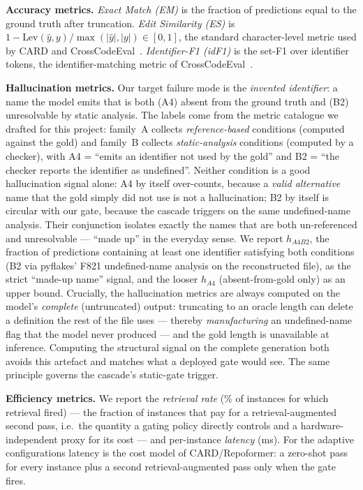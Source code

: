 \documentclass[10pt,conference]{IEEEtran}
\newcommand{\ugr}[1]{{\color{revgreen}#1}}
\begin{document}
\textbf{Accuracy metrics.} \emph{Exact Match (EM)} is the fraction of predictions
equal to the ground truth after truncation. \emph{Edit Similarity (ES)} is
$1-\text{Lev}(\hat{y},y)/\max(|\hat{y}|,|y|)\in[0,1]$, the standard
character-level metric used by CARD and CrossCodeEval~\cite{zhang2024card,ding2023cce}.
\emph{Identifier-F1 (idF1)} is the set-F1 over identifier tokens, the
identifier-matching metric of CrossCodeEval~\cite{ding2023cce}.

\textbf{Hallucination metrics.} Our target failure mode is the \emph{invented
identifier}: a name the model emits that is both (A4) absent from the ground truth
and (B2) unresolvable by static analysis. \ugr{The labels come from the metric
catalogue we drafted for this project: family~A collects \emph{reference-based}
conditions (computed against the gold) and family~B collects
\emph{static-analysis} conditions (computed by a checker), with A4 =
``emits an identifier not used by the gold'' and B2 = ``the checker reports the
identifier as undefined''. Neither condition is a good hallucination signal
alone: A4 by itself over-counts, because a \emph{valid alternative} name that
the gold simply did not use is not a hallucination; B2 by itself is circular
with our gate, because the cascade triggers on the same undefined-name analysis.
Their conjunction isolates exactly the names that are both un-referenced and
unresolvable --- ``made up'' in the everyday sense.} We report \textbf{$h_{A4B2}$}, the
fraction of predictions containing at least one identifier satisfying both
conditions (B2 via pyflakes' F821 undefined-name analysis on the reconstructed
file), as the strict ``made-up name'' signal, and the looser \textbf{$h_{A4}$}
(absent-from-gold only) as an upper bound. Crucially, the hallucination metrics
are always computed on the model's \emph{complete} (untruncated) output: truncating
to an oracle length can delete a definition the rest of the file uses --- thereby
\emph{manufacturing} an undefined-name flag that the model never produced --- and
the gold length is unavailable at inference. Computing the structural signal on the
complete generation both avoids this artefact and matches what a deployed gate
would see. The same principle governs the cascade's static-gate trigger.

\textbf{Efficiency metrics.} We report the \emph{retrieval rate} (\% of instances
for which retrieval fired)\ugr{ --- the fraction of instances that pay for a
retrieval-augmented second pass, i.e.\ the quantity a gating policy directly
controls and a hardware-independent proxy for its cost ---} and per-instance
\emph{latency} (ms). For the adaptive configurations latency is the cost model of
CARD/Repoformer: a zero-shot pass for every instance plus a second
retrieval-augmented pass only when the gate fires.
\end{document}
